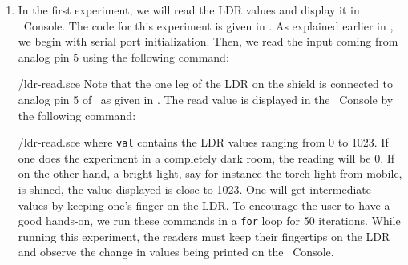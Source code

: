 \begin{enumerate}
  \item In the first experiment, we will read the LDR values and display it in
        \scilab\ Console. The code for this experiment is 
        given in  . As explained earlier in , 
        we begin with serial port initialization. Then, we read the input coming from
        analog pin 5 using the following command:  
        
        {\LocLDRscicode/ldr-read.sce}
        Note that the one leg of the LDR on
        the shield is connected to analog pin 5 of \arduino\, 
        as given in . The read value is displayed in the 
        \scilab\ Console by the following command: 
        
        {\LocLDRscicode/ldr-read.sce} where {\tt val} contains
        the LDR values ranging from 0 to 1023. If one does the experiment in a completely dark room, the
        reading will be 0. If on the other hand, a bright light, say for instance the torch
        light from mobile, is shined, the value displayed is close to 1023. One will get
        intermediate values by keeping one’s finger on the LDR. To
        encourage the user to have a good hands-on, we run these commands in
        a {\tt for} loop for 50 iterations. While running this experiment, the readers must keep their fingertips on the LDR and
        observe the change in values being printed on the \scilab\ Console. 
        
        
        

\end{enumerate}

